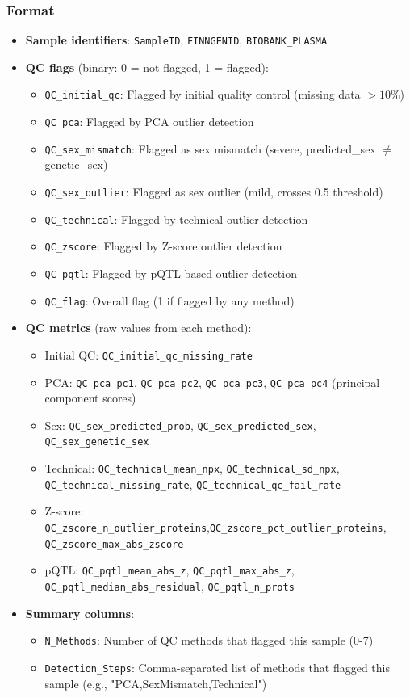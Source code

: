 \documentclass[11pt,a4paper]{article}
\begin{document}
\subsubsection{Format}
\begin{itemize}
\item \textbf{Sample identifiers}: \texttt{SampleID}, \texttt{FINNGENID}, \texttt{BIOBANK\_PLASMA}
\item \textbf{QC flags} (binary: 0 = not flagged, 1 = flagged):
  \begin{itemize}
    \item \texttt{QC\_initial\_qc}: Flagged by initial quality control (missing data $>10\%$)
    \item \texttt{QC\_pca}: Flagged by PCA outlier detection
    \item \texttt{QC\_sex\_mismatch}: Flagged as sex mismatch (severe, predicted\_sex $\neq$ genetic\_sex)
    \item \texttt{QC\_sex\_outlier}: Flagged as sex outlier (mild, crosses 0.5 threshold)
    \item \texttt{QC\_technical}: Flagged by technical outlier detection
    \item \texttt{QC\_zscore}: Flagged by Z-score outlier detection
    \item \texttt{QC\_pqtl}: Flagged by pQTL-based outlier detection
    \item \texttt{QC\_flag}: Overall flag (1 if flagged by any method)
  \end{itemize}
\item \textbf{QC metrics} (raw values from each method):
  \begin{itemize}
    \item Initial QC: \texttt{QC\_initial\_qc\_missing\_rate}
    \item PCA: \texttt{QC\_pca\_pc1}, \texttt{QC\_pca\_pc2}, \texttt{QC\_pca\_pc3}, \texttt{QC\_pca\_pc4} (principal component scores)
    \item Sex: \texttt{QC\_sex\_predicted\_prob}, \texttt{QC\_sex\_predicted\_sex}, \texttt{QC\_sex\_genetic\_sex}
    \item Technical: \texttt{QC\_technical\_mean\_npx}, \texttt{QC\_technical\_sd\_npx}, \texttt{QC\_technical\_missing\_rate}, \texttt{QC\_technical\_qc\_fail\_rate}
    \item Z-score: \texttt{QC\_zscore\_n\_outlier\_proteins},\texttt{QC\_zscore\_pct\_outlier\_proteins},\\ \texttt{QC\_zscore\_max\_abs\_zscore}
    \item pQTL: \texttt{QC\_pqtl\_mean\_abs\_z}, \texttt{QC\_pqtl\_max\_abs\_z}, \texttt{QC\_pqtl\_median\_abs\_residual}, \texttt{QC\_pqtl\_n\_prots}
  \end{itemize}
\item \textbf{Summary columns}:
  \begin{itemize}
    \item \texttt{N\_Methods}: Number of QC methods that flagged this sample (0-7)
    \item \texttt{Detection\_Steps}: Comma-separated list of methods that flagged this sample (e.g., "PCA,SexMismatch,Technical")
  \end{itemize}
\end{itemize}
\end{document}
